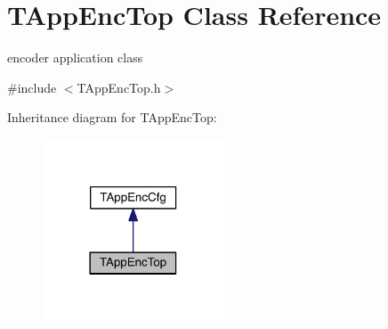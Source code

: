 \hypertarget{class_t_app_enc_top}{}\section{T\+App\+Enc\+Top Class Reference}
\label{class_t_app_enc_top}


encoder application class  




{\ttfamily \#include $<$T\+App\+Enc\+Top.\+h$>$}



Inheritance diagram for T\+App\+Enc\+Top\+:
\nopagebreak
\begin{figure}[H]
\begin{center}
\leavevmode
\includegraphics[width=153pt]{d3/d0d/class_t_app_enc_top__inherit__graph}
\end{center}
\end{figure}


